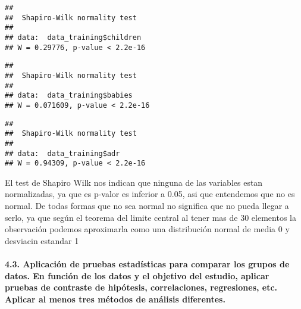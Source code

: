 \documentclass[]{article}
\newenvironment{Shaded}{\begin{snugshade}}{\end{snugshade}}
\newcommand{\KeywordTok}[1]{\textcolor[rgb]{0.13,0.29,0.53}{\textbf{#1}}}
\newcommand{\NormalTok}[1]{#1}
\newcommand{\OperatorTok}[1]{\textcolor[rgb]{0.81,0.36,0.00}{\textbf{#1}}}
\let\oldparagraph\paragraph
\renewcommand{\paragraph}[1]{\oldparagraph{#1}\mbox{}}
\begin{document}
\begin{Shaded}
\end{Shaded}

\begin{verbatim}
## 
##  Shapiro-Wilk normality test
## 
## data:  data_training$children
## W = 0.29776, p-value < 2.2e-16
\end{verbatim}

\begin{Shaded}
\end{Shaded}

\begin{verbatim}
## 
##  Shapiro-Wilk normality test
## 
## data:  data_training$babies
## W = 0.071609, p-value < 2.2e-16
\end{verbatim}

\begin{Shaded}
\end{Shaded}

\begin{verbatim}
## 
##  Shapiro-Wilk normality test
## 
## data:  data_training$adr
## W = 0.94309, p-value < 2.2e-16
\end{verbatim}

El test de Shapiro Wilk nos indican que ninguna de las variables estan
normalizadas, ya que es p-valor es inferior a 0.05, asi que entendemos
que no es normal. De todas formas que no sea normal no significa que no
pueda llegar a serlo, ya que según el teorema del limite central al
tener mas de 30 elementos la observación podemos aproximarla como una
distribución normal de media 0 y desviacin estandar 1

\hypertarget{aplicaciuxf3n-de-pruebas-estaduxedsticas-para-comparar-los-grupos-de-datos.-en-funciuxf3n-de-los-datos-y-el-objetivo-del-estudio-aplicar-pruebas-de-contraste-de-hipuxf3tesis-correlaciones-regresiones-etc.-aplicar-al-menos-tres-muxe9todos-de-anuxe1lisis-diferentes.}{%
\paragraph{4.3. Aplicación de pruebas estadísticas para comparar los
grupos de datos. En función de los datos y el objetivo del estudio,
aplicar pruebas de contraste de hipótesis, correlaciones, regresiones,
etc. Aplicar al menos tres métodos de análisis
diferentes.}\label{aplicaciuxf3n-de-pruebas-estaduxedsticas-para-comparar-los-grupos-de-datos.-en-funciuxf3n-de-los-datos-y-el-objetivo-del-estudio-aplicar-pruebas-de-contraste-de-hipuxf3tesis-correlaciones-regresiones-etc.-aplicar-al-menos-tres-muxe9todos-de-anuxe1lisis-diferentes.}}
\end{document}
